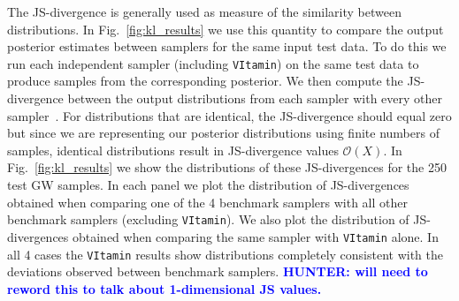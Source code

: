 \documentclass[%
showpacs,
nofootinbib,
 amsmath,amssymb,
 aps,
 twocolumn,
 prl,
 reprint,
floatfix,
]{revtex4-1}
\newcommand{\hunter}[1]{\textbf{\textcolor{blue}{HUNTER: #1}}}
\begin{document}
%
%
The \ac{JS}-divergence is generally used as measure of the similarity
between distributions. In Fig.~\ref{fig:kl_results} we use this quantity to
compare the output posterior estimates between samplers for the same input test
data. To do this we run each independent sampler (including \texttt{VItamin})
on the same test data to produce samples from the corresponding posterior. We
then compute the \ac{JS}-divergence between the output distributions from each
sampler with every other sampler~\cite{4839047}.  For distributions that are
identical, the \ac{JS}-divergence {should} equal zero but since we are
representing our posterior distributions using finite numbers of samples,
identical distributions result in \ac{JS}-divergence values $\mathcal{O}(X)$.
In Fig.~\ref{fig:kl_results} we show the distributions of these
\ac{JS}-divergences for the 250 test \ac{GW} samples. In each panel we plot the
distribution of \ac{JS}-divergences obtained when comparing one of the 4
benchmark samplers with all other benchmark samplers (excluding
\texttt{VItamin}). We also plot the distribution of \ac{JS}-divergences
obtained when comparing the same sampler with \texttt{VItamin} alone. In all 4
cases the \texttt{VItamin} results show distributions completely consistent
with the deviations observed between benchmark samplers. \hunter{will need to 
reword this to talk about 1-dimensional JS values.}  


\end{document}
